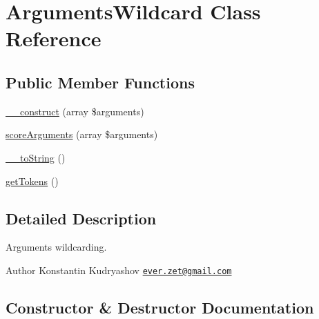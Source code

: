 \hypertarget{class_prophecy_1_1_argument_1_1_arguments_wildcard}{}\section{Arguments\+Wildcard Class Reference}
\label{class_prophecy_1_1_argument_1_1_arguments_wildcard}
\subsection*{Public Member Functions}
\begin{DoxyCompactItemize}
\item 
\mbox{\hyperlink{class_prophecy_1_1_argument_1_1_arguments_wildcard_ae100579627fc7364dfae61182fbe1ac7}{\+\_\+\+\_\+construct}} (array \$arguments)
\item 
\mbox{\hyperlink{class_prophecy_1_1_argument_1_1_arguments_wildcard_a4d5364b222e55591a19a5b2ca6e61231}{score\+Arguments}} (array \$arguments)
\item 
\mbox{\hyperlink{class_prophecy_1_1_argument_1_1_arguments_wildcard_a7516ca30af0db3cdbf9a7739b48ce91d}{\+\_\+\+\_\+to\+String}} ()
\item 
\mbox{\hyperlink{class_prophecy_1_1_argument_1_1_arguments_wildcard_acf2f05f60b57bd67020d2259a2cf9982}{get\+Tokens}} ()
\end{DoxyCompactItemize}


\subsection{Detailed Description}
Arguments wildcarding.

\begin{DoxyAuthor}{Author}
Konstantin Kudryashov \href{mailto:ever.zet@gmail.com}{\tt ever.\+zet@gmail.\+com} 
\end{DoxyAuthor}


\subsection{Constructor \& Destructor Documentation}
\mbox{\label{class_prophecy_1_1_argument_1_1_arguments_wildcard_ae100579627fc7364dfae61182fbe1ac7}} 
